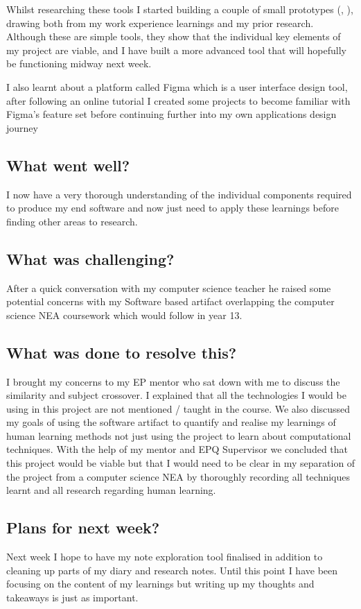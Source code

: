 Whilst researching these tools I started building a couple of small prototypes (, ), drawing both from my work experience learnings and my prior research. Although these are simple tools, they show that the individual key elements of my project are viable, and I have built a more advanced tool that will hopefully be functioning midway next week.

I also learnt about a platform called Figma which is a user interface design tool, after following an online tutorial \cite{kevinstratvertFigmaTutorialBeginners2024} I created some  projects to become familiar with Figma's feature set before continuing further into my own applications design journey

\subsection*{What went well?}
I now have a very thorough understanding of the individual components required to produce my end software and now just need to apply these learnings before finding other areas to research.


\subsection*{What was challenging?}
After a quick conversation with my computer science teacher he raised some potential concerns with my Software based artifact overlapping the computer science NEA coursework which would follow in year 13.
\subsection*{What was done to resolve this?}
I brought my concerns to my EP mentor who sat down with me to discuss the similarity and subject crossover. I explained that all the technologies I would be using in this project are not mentioned / taught in the course. We also discussed my goals of using the software artifact to quantify and realise my learnings of human learning methods not just using the project to learn about computational techniques. With the help of my mentor and EPQ Supervisor we concluded that this project would be viable but that I would need to be clear in my separation of the project from a computer science NEA by thoroughly recording all techniques learnt and all research regarding human learning.
\subsection*{Plans for next week?}
Next week I hope to have my note exploration tool finalised in addition to cleaning up parts of my diary and research notes. Until this point I have been focusing on the content of my learnings but writing up my thoughts and takeaways is just as important.

